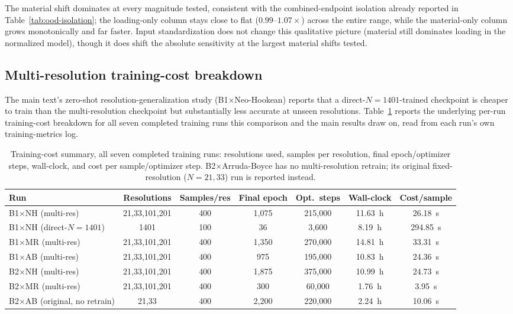 \documentclass[final,5p,times]{elsarticle}
\begin{document}
The material shift dominates at every magnitude tested, consistent with
the combined-endpoint isolation already reported in
Table~\ref{tab:ood-isolation}; the loading-only column stays close to
flat ($0.99$--$1.07\times$) across the entire range, while the
material-only column grows monotonically and far faster. Input
standardization does not change this qualitative picture (material still
dominates loading in the normalized model), though it does shift the
absolute sensitivity at the largest material shifts tested.

\subsection{Multi-resolution training-cost breakdown}
The main text's zero-shot resolution-generalization study
(B1$\times$Neo-Hookean) reports that a direct-$N{=}1401$-trained
checkpoint is cheaper to train than the multi-resolution checkpoint but
substantially less accurate at unseen resolutions. Table~\ref{tab:d3}
reports the underlying per-run training-cost breakdown for all seven
completed training runs this comparison and the main results draw on,
read from each run's own training-metrics log.

\begin{table}[ht]
\centering
\caption{Training-cost summary, all seven completed training runs:
  resolutions used, samples per resolution, final epoch/optimizer steps,
  wall-clock, and cost per sample/optimizer step. B2$\times$Arruda-Boyce
  has no multi-resolution retrain; its original fixed-resolution
  ($N{=}21,33$) run is reported instead.}
\label{tab:d3}
\footnotesize
\begin{tabular}{lcccccc}
\toprule
Run & Resolutions & Samples/res & Final epoch & Opt.\ steps & Wall-clock & Cost/sample \\
\midrule
B1$\times$NH (multi-res)       & 21,33,101,201 & 400 & 1{,}075 & 215{,}000 & 11.63~h & 26.18~s \\
B1$\times$NH (direct-$N{=}1401$) & 1401        & 100 & 36      & 3{,}600   & 8.19~h  & 294.85~s \\
B1$\times$MR (multi-res)       & 21,33,101,201 & 400 & 1{,}350 & 270{,}000 & 14.81~h & 33.31~s \\
B1$\times$AB (multi-res)       & 21,33,101,201 & 400 & 975     & 195{,}000 & 10.83~h & 24.36~s \\
B2$\times$NH (multi-res)       & 21,33,101,201 & 400 & 1{,}875 & 375{,}000 & 10.99~h & 24.73~s \\
B2$\times$MR (multi-res)       & 21,33,101,201 & 400 & 300     & 60{,}000  & 1.76~h  & 3.95~s \\
B2$\times$AB (original, no retrain) & 21,33     & 400 & 2{,}200 & 220{,}000 & 2.24~h  & 10.06~s \\
\bottomrule
\end{tabular}
\end{table}
\end{document}
